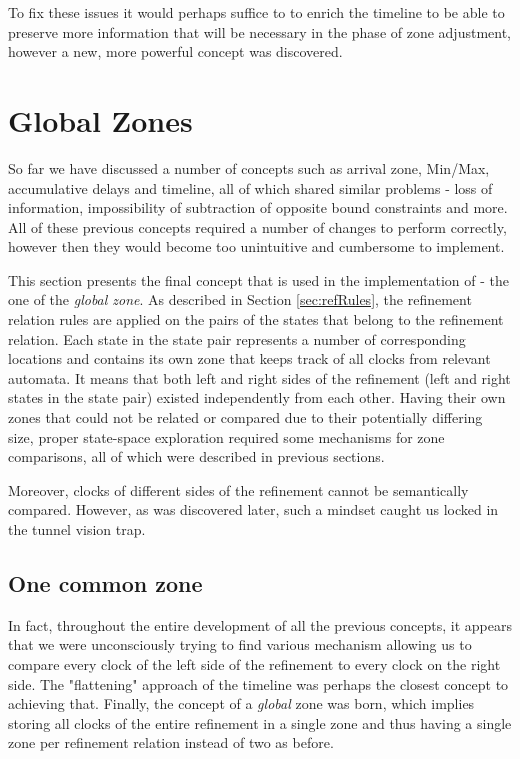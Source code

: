 To fix these issues it would perhaps suffice to to enrich the timeline to be able to preserve more information that will be necessary in the phase of zone adjustment, however a new, more powerful concept was discovered.

\section{Global Zones}\label{sec:globalZone}
So far we have discussed a number of concepts such as arrival zone, Min/Max, accumulative delays and timeline, all of which shared similar problems - loss of information, impossibility of subtraction of opposite bound constraints and more. All of these previous concepts required a number of changes to perform correctly, however then they would become too unintuitive and cumbersome to implement.

This section presents the final concept that is used in the implementation of \jecdar - the one of the \textit{global zone}. As described in Section \ref{sec:refRules}, the refinement relation rules are applied on the pairs of the states that belong to the refinement relation. Each state in the state pair represents a number of corresponding locations and contains its own zone that keeps track of all clocks from relevant automata. It means that both left and right sides of the refinement (left and right states in the state pair) existed independently from each other. Having their own zones that could not be related or compared due to their potentially differing size, proper state-space exploration required some mechanisms for zone comparisons, all of which were described in previous sections.

Moreover, clocks of different sides of the refinement cannot be semantically compared. However, as was discovered later, such a mindset caught us locked in the tunnel vision trap.

\subsection{One common zone}
In fact, throughout the entire development of all the previous concepts, it appears that we were unconsciously trying to find various mechanism allowing us to compare every clock of the left side of the refinement to every clock on the right side. The "flattening" approach of the timeline was perhaps the closest concept to achieving that. Finally, the concept of a \textit{global} zone was born, which implies storing all clocks of the entire refinement in a single zone and thus having a single zone per refinement relation instead of two as before. 

